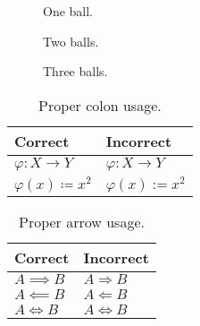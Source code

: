 

\begin{figure}[htbp]
    \centering
    \caption[One ball]{One ball.}
\end{figure}

\begin{figure}[thbp]
    \centering
    \caption[Two balls]{Two balls.}
\end{figure}

\begin{figure}[hbp]
    \centering
    \caption[Three balls]{Three balls.}
\end{figure}


\begin{table}[htbp]
    \centering
    \begin{tabular}{@{}ll@{}}
        \toprule
        \textbf{Correct}               & \textbf{Incorrect}      \\
        \midrule
        \( \varphi \colon X \to Y \)   & \( \varphi : X \to Y \) \\[0.5ex]
        \( \varphi(x) \coloneqq x^2 \) & \( \varphi(x) := x^2 \) \\
        \bottomrule
    \end{tabular}
    \caption[Colons]{Proper colon usage.}
\end{table}

\begin{table}[htbp]
    \centering
    \begin{tabular}{@{}ll@{}}
        \toprule
        \textbf{Correct}     & \textbf{Incorrect}         \\
        \midrule
        \( A \implies B \)   & \( A \Rightarrow B \)      \\
        \( A \impliedby B \) & \( A \Leftarrow B \)       \\
        \( A \iff B \)       & \( A \Leftrightarrow B \)  \\
        \bottomrule
    \end{tabular}
    \caption[Arrows]{Proper arrow usage.}
\end{table}

